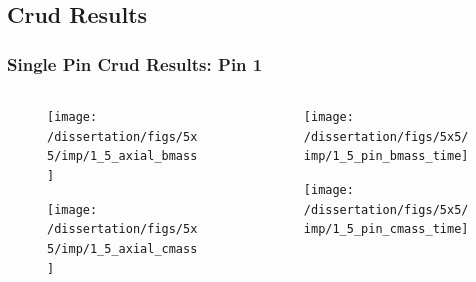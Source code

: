 \documentclass[t, pdftex]{beamer}
\begin{document}
\subsection*{Crud Results}
\begin{frame}
\frametitle{Single Pin Crud Results: Pin 1}
\vspace{-42pt}
\begin{columns}
    \begin{column}{0.5\textwidth}
        \begin{figure}[H]%
            \texttt{[image: /dissertation/figs/5x5/imp/1\_5\_axial\_bmass]}
        \end{figure}
        \vspace{-26pt}
        \begin{figure}[H]%
            \texttt{[image: /dissertation/figs/5x5/imp/1\_5\_axial\_cmass]}
        \end{figure}
    \end{column}
    \begin{column}{0.5\textwidth}
        \begin{figure}[H]%
            \texttt{[image: /dissertation/figs/5x5/imp/1\_5\_pin\_bmass\_time]}
        \end{figure}
        \vspace{-26pt}
        \begin{figure}[H]%
            \texttt{[image: /dissertation/figs/5x5/imp/1\_5\_pin\_cmass\_time]}
        \end{figure}
    \end{column}
\end{columns}
\end{frame}
\end{document}
